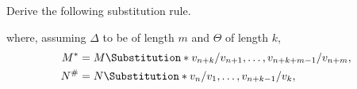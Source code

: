 \begin{exercise}
Derive the following substitution rule.
\begin{prooftree}
\end{prooftree}
where, assuming \(\Delta\) to be of length \(m\) and \(\Theta\) of length \(k\),
\begin{align*}
M^* &= M\Substitution*{v_{n+k} / v_{n+1}, \ldots, v_{n+k+m-1} / v_{n+m}}, \\
N^{\#} &= N\Substitution*{v_n / v_1, \ldots, v_{n+k-1} / v_k},
\end{align*}
\end{exercise}
